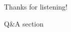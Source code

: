 \documentclass[13.5pt,aspecratio=169]{beamer}
\begin{document}

\begin{frame} %
	\begin{center}
		{\Huge Thanks for listening!}
		
		\bigskip\bigskip %
		
		{\LARGE Q\&A section}
	\end{center}
\end{frame}
\end{document}
